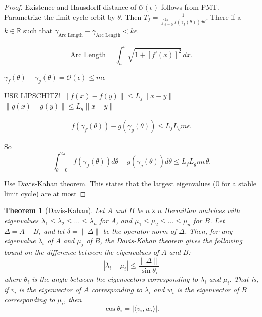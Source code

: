 \documentclass{article}
\newtheorem{theorem}{Theorem}
\theoremstyle{definition} \newtheorem{definition}{Definition}
\theoremstyle{remark} \newtheorem{remark}{Remark}
\newcommand{\reals}{\mathbb{R}}
\newcounter{ct}
\begin{document}
\begin{proof}
Existence and Hausdorff distance of $\mathcal{O}(\epsilon)$ follows from PMT.
Parametrize the limit cycle orbit by $\theta$.
Then $T_f = \frac{1}{\int_{\theta=0}^{2\pi}f(\gamma_f(\theta))d\theta}$.
There if a $k\in\reals$ such that $\gamma_{\text{Arc Length}} - \gamma_{\text{Arc Length}}<k\epsilon$.

\[\text{Arc Length} = \int_a^b \sqrt{1 + [f'(x)]^2} \, dx.\]

$\gamma_f(\theta)-\gamma_g(\theta) = \mathcal{O}(\epsilon) \leq m\epsilon$ %


USE LIPSCHITZ! 
$\|f(x)-f(y)\|\leq L_f\|x-y\|$
$\|g(x)-g(y)\|\leq L_g\|x-y\|$


\begin{align}
f(\gamma_f(\theta)) - g(\gamma_g(\theta)) \leq  L_fL_gm\epsilon.
\end{align}

So \[\int_{\theta=0}^{2\pi}f(\gamma_f(\theta))d\theta-g(\gamma_g(\theta))d\theta\leq L_fL_gm\epsilon\theta.\]


Use Davis-Kahan theorem. 
This states that the largest eigenvalues (0 for a stable limit cycle) are at most 
\end{proof}


\begin{theorem}[Davis-Kahan]
Let \( A \) and \( B \) be \( n \times n \) Hermitian matrices with eigenvalues \( \lambda_1 \leq \lambda_2 \leq \dots \leq \lambda_n \) for \( A \), and \( \mu_1 \leq \mu_2 \leq \dots \leq \mu_n \) for \( B \). Let \( \Delta = A - B \), and let \( \delta = \| \Delta \| \) be the operator norm of \( \Delta \). Then, for any eigenvalue \( \lambda_i \) of \( A \) and \( \mu_j \) of \( B \), the Davis-Kahan theorem gives the following bound on the difference between the eigenvalues of \( A \) and \( B \):
\[
|\lambda_i - \mu_i| \leq \frac{\| \Delta \|}{\sin \theta_i}
\]
where \( \theta_i \) is the angle between the eigenvectors corresponding to \( \lambda_i \) and \( \mu_i \). That is, if \( v_i \) is the eigenvector of \( A \) corresponding to \( \lambda_i \) and \( w_i \) is the eigenvector of \( B \) corresponding to \( \mu_i \), then
\[
\cos \theta_i = | \langle v_i, w_i \rangle |.
\]
\end{theorem}
\end{document}
